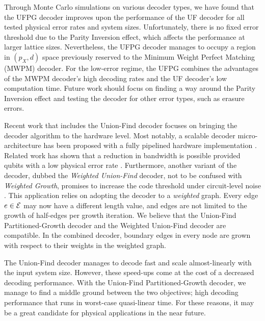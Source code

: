 Through Monte Carlo simulations on various decoder types, we have found that the UFPG decoder improves upon the performance of the UF decoder for all tested physical error rates and system sizes. Unfortunately, there is no fixed error threshold due to the Parity Inversion effect, which affects the performance at larger lattice sizes. Nevertheless, the UFPG decoder manages to occupy a region in $(p_X, d)$ space previously reserved to the Minimum Weight Perfect Matching (MWPM) decoder. For the low-error regime, the UFPG combines the advantages of the MWPM decoder's high decoding rates and the UF decoder's low computation time. Future work should focus on finding a way around the Parity Inversion effect and testing the decoder for other error types, such as erasure errors. 

Recent work that includes the Union-Find decoder focuses on bringing the decoder algorithm to the hardware level. Most notably, a scalable decoder micro-architecture has been proposed with a fully pipelined hardware implementation \cite{das2020scalable}. Related work has shown that a reduction in bandwidth is possible provided qubits with a low physical error rate \cite{delfosse2020hierarchical}. Furthermore, another variant of the decoder, dubbed the \emph{Weighted Union-Find} decoder, not to be confused with \emph{Weighted Growth}, promises to increase the code threshold under circuit-level noise \cite{huang2020fault}. This application relies on adopting the decoder to a \emph{weighted} graph. Every edge $e\in\mathcal{E}$ may now have a different length value, and edges are not limited to the growth of half-edges per growth iteration. We believe that the Union-Find Partitioned-Growth decoder and the Weighted Union-Find decoder are compatible. In the combined decoder, boundary edges in every node are grown with respect to their weights in the weighted graph. 

The Union-Find decoder manages to decode fast and scale almost-linearly with the input system size. However, these speed-ups come at the cost of a decreased decoding performance. With the Union-Find Partitioned-Growth decoder, we manage to find a middle ground between the two objectives; high decoding performance that runs in worst-case quasi-linear time. For these reasons, it may be a great candidate for physical applications in the near future.

